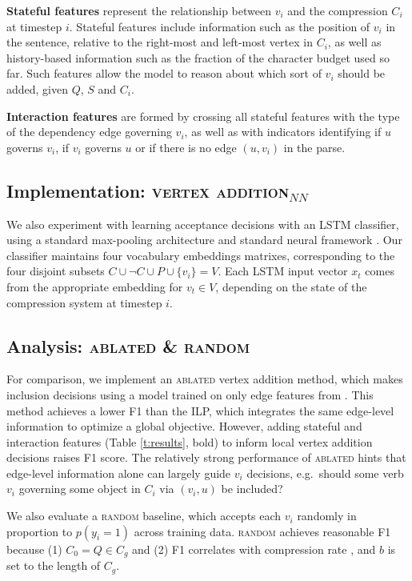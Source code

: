 \documentclass[11pt,a4paper]{article}
\begin{document}
\textbf{Stateful features} represent the relationship between $v_i$ and the compression $C_i$ at timestep $i$. Stateful features include information such as the position of $v_i$ in the sentence, relative to the right-most and left-most vertex in $C_i$, as well as history-based information such as the fraction of the character budget used so far. Such features allow the model to reason about which sort of $v_i$ should be added, given $Q$, $S$ and $C_i$.

\textbf{Interaction features} are formed by crossing all stateful features with the type of the dependency edge governing $v_i$, as well as with indicators identifying if $u$ governs $v_i$, if $v_i$ governs $u$ or if there is no edge $(u,v_i)$ in the parse.

\subsection{Implementation: \textsc{vertex addition}$_{NN}$}\label{s:transition}
We also experiment with learning acceptance decisions with an LSTM classifier, using a standard max-pooling architecture and standard neural framework \cite{D17-1070,Gardner2017AllenNLP}. Our classifier maintains four vocabulary embeddings matrixes, corresponding to the four disjoint subsets $C \cup \neg C \cup P \cup \{v_i\} = V$. Each LSTM input vector $x_t$ comes from the appropriate embedding for $v_t \in V$, depending on the state of the compression system at timestep $i$.

\subsection{Analysis:  \textsc{ablated} \& \textsc{random}}\label{s:ablated}
For comparison, we implement an \textsc{ablated} vertex addition method, which makes inclusion decisions using a model trained on only edge features from \citet{filippova2013overcoming}. This method achieves a lower F1 than the ILP, which integrates the same edge-level information to optimize a global objective. However, adding stateful and interaction features (Table \ref{t:results}, bold) to inform local vertex addition decisions raises F1 score. The relatively strong performance of \textsc{ablated} hints that edge-level information alone can largely guide $v_i$ decisions, e.g.\ should some verb $v_i$ governing some object in $C_i$ via $(v_i,u)$ be included?

We also evaluate a \textsc{random} baseline, which accepts each $v_i$ randomly in proportion to $p(y_i = 1)$ across training data. \textsc{random} achieves reasonable F1 because (1) $C_0 = Q \in C_g$ and (2) F1 correlates with compression rate \cite{napoles2011evaluating}, and $b$ is set to the length of $C_g$.
\end{document}
